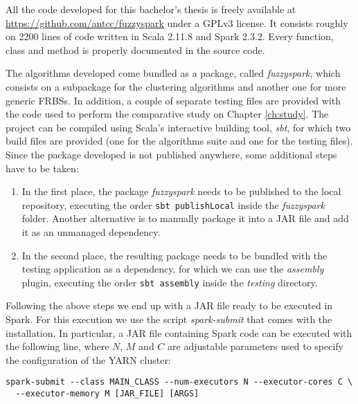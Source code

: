 %
%
%

All the code developed for this bachelor's thesis is freely available at \url{https://github.com/antcc/fuzzyspark} under a GPLv3 license. It consists roughly on 2200 lines of code written in Scala 2.11.8 and Spark 2.3.2. Every function, class and method is properly documented in the source code.

The algorithms developed come bundled as a package, called \textit{fuzzyspark}, which consists on a subpackage for the clustering algorithms and another one for more generic FRBSs. In addition, a couple of separate testing files are provided with the code used to perform the comparative study on Chapter \ref{ch:study}. The project can be compiled using Scala's interactive building tool, \textit{sbt}, for which two build files are provided (one for the algorithms suite and one for the testing files). Since the package developed is not published anywhere, some additional steps have to be taken:

\begin{enumerate}[1.]
  \item In the first place, the package \textit{fuzzyspark} needs to be published to the local repository, executing the order \verb|sbt publishLocal| inside the \textit{fuzzyspark} folder. Another alternative is to manually package it into a JAR file and add it as an unmanaged dependency.
  \item In the second place, the resulting package needs to be bundled with the testing application as a dependency, for which we can use the \textit{assembly} plugin, executing the order \verb|sbt assembly| inside the \textit{testing} directory.
\end{enumerate}
Following the above steps we end up with a JAR file ready to be executed in Spark. For this execution we use the script \textit{spark-submit} that comes with the installation. In particular, a JAR file containing Spark code can be executed with the following line, where $N$, $M$ and $C$ are adjustable parameters used to specify the configuration of the YARN cluster:

\begin{verbatim}
spark-submit --class MAIN_CLASS --num-executors N --executor-cores C \
  --executor-memory M [JAR_FILE] [ARGS]
\end{verbatim}

